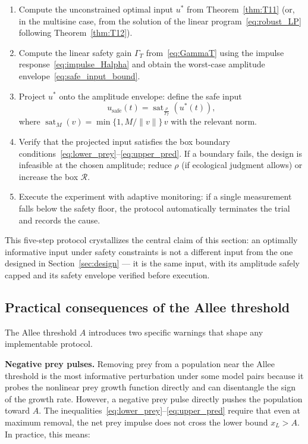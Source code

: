 \begin{enumerate}
\item Compute the unconstrained optimal input \(u^*\) from Theorem~\ref{thm:T11} (or, in the multisine case, from the solution of the linear program~\eqref{eq:robust_LP} following Theorem~\ref{thm:T12}).
\item Compute the linear safety gain \(\Gamma_T\) from~\eqref{eq:GammaT} using the impulse response~\eqref{eq:impulse_Halpha} and obtain the worst-case amplitude envelope~\eqref{eq:safe_input_bound}.
\item Project \(u^*\) onto the amplitude envelope: define the safe input
\begin{equation}
u_{\text{safe}}(t) = \operatorname{sat}_{\frac{\rho}{\Gamma_T}}\!(u^*(t)),
\end{equation}
where \(\operatorname{sat}_M(v) = \min\{1, M/\|v\|\} \, v\) with the relevant norm.
\item Verify that the projected input satisfies the box boundary conditions~\eqref{eq:lower_prey}--\eqref{eq:upper_pred}. If a boundary fails, the design is infeasible at the chosen amplitude; reduce \(\rho\) (if ecological judgment allows) or increase the box \(\mathcal{R}\).
\item Execute the experiment with adaptive monitoring: if a single measurement falls below the safety floor, the protocol automatically terminates the trial and records the cause.
\end{enumerate}

This five-step protocol crystallizes the central claim of this section: an optimally informative input under safety constraints is not a different input from the one designed in Section~\ref{sec:design} --- it is the same input, with its amplitude safely capped and its safety envelope verified before execution.

\subsection{Practical consequences of the Allee threshold}

The Allee threshold \(A\) introduces two specific warnings that shape any implementable protocol.

\textbf{Negative prey pulses.} Removing prey from a population near the Allee threshold is the most informative perturbation under some model pairs because it probes the nonlinear prey growth function directly and can disentangle the sign of the growth rate. However, a negative prey pulse directly pushes the population toward \(A\). The inequalities~\eqref{eq:lower_prey}--\eqref{eq:upper_pred} require that even at maximum removal, the net prey impulse does not cross the lower bound \(x_L > A\). In practice, this means:

